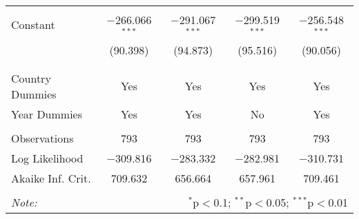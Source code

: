 \begin{table}[!htbp]
\begin{tabular}{@{\extracolsep{5pt}}lcccc}
  & & & & \\ 
 Constant & $-$266.066$^{***}$ & $-$291.067$^{***}$ & $-$299.519$^{***}$ & $-$256.548$^{***}$ \\ 
  & (90.398) & (94.873) & (95.516) & (90.056) \\ 
  & & & & \\ 
\hline \\[-1.8ex] 
Country Dummies & Yes & Yes & Yes & Yes \\ 
Year Dummies & Yes & Yes & No & Yes \\ 
\hline \\[-1.8ex] 
Observations & 793 & 793 & 793 & 793 \\ 
Log Likelihood & $-$309.816 & $-$283.332 & $-$282.981 & $-$310.731 \\ 
Akaike Inf. Crit. & 709.632 & 656.664 & 657.961 & 709.461 \\ 
\hline 
\hline \\[-1.8ex] 
\textit{Note:}  & \multicolumn{4}{r}{$^{*}$p$<$0.1; $^{**}$p$<$0.05; $^{***}$p$<$0.01} \\ 
\end{tabular} 
\end{table} 
